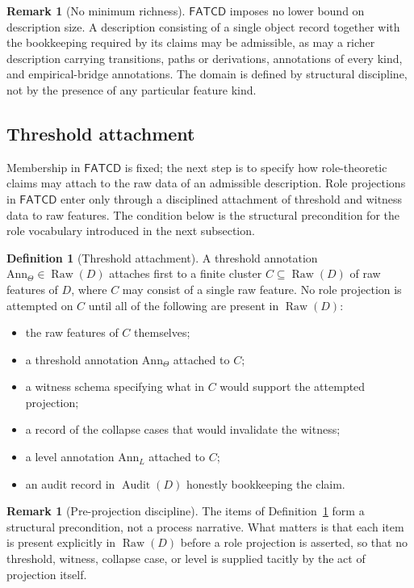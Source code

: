 \documentclass[11pt]{article}
\theoremstyle{definition}
\newtheorem{definition}[theorem]{Definition}
\newtheorem{remark}[theorem]{Remark}
\newcommand{\FATCD}{\ensuremath{\mathsf{FATCD}}}
\newcommand{\Raw}[1]{\ensuremath{\operatorname{Raw}\!\left(#1\right)}}
\newcommand{\Audit}[1]{\ensuremath{\operatorname{Audit}\!\left(#1\right)}}
\begin{document}
\begin{remark}[No minimum richness]\label{rem:fatcd-minimality}
\FATCD{} imposes no lower bound on description size. A description
consisting of a single object record together with the bookkeeping
required by its claims may be admissible, as may a richer description
carrying transitions, paths or derivations, annotations of every kind,
and empirical-bridge annotations. The domain is defined by structural
discipline, not by the presence of any particular feature kind.
\end{remark}

\subsection{Threshold attachment}\label{subsec:threshold-attachment}

Membership in \FATCD{} is fixed; the next step is to specify how
role-theoretic claims may attach to the raw data of an admissible
description. Role projections in \FATCD{} enter only through a
disciplined attachment of threshold and witness data to raw features.
The condition below is the structural precondition for the role
vocabulary introduced in the next subsection.

\begin{definition}[Threshold attachment]\label{def:threshold-attachment}
A threshold annotation \(\mathrm{Ann}_\Theta \in \Raw{D}\) attaches first to
a finite cluster \(C \subseteq \Raw{D}\) of raw features of \(D\), where \(C\)
may consist of a single raw feature. No role projection is attempted on \(C\)
until all of the following are present in \(\Raw{D}\):
\begin{itemize}[topsep=2pt,itemsep=1pt]
  \item the raw features of \(C\) themselves;
  \item a threshold annotation \(\mathrm{Ann}_\Theta\) attached to \(C\);
  \item a witness schema specifying what in \(C\) would support the attempted
    projection;
  \item a record of the collapse cases that would invalidate the witness;
  \item a level annotation \(\mathrm{Ann}_L\) attached to \(C\);
  \item an audit record in \(\Audit{D}\) honestly bookkeeping the claim.
\end{itemize}
\end{definition}

\begin{remark}[Pre-projection discipline]\label{rem:pre-projection}
The items of Definition~\ref{def:threshold-attachment} form a structural
precondition, not a process narrative. What matters is that each item is
present explicitly in \(\Raw{D}\) before a role projection is asserted, so
that no threshold, witness, collapse case, or level is supplied tacitly by
the act of projection itself.
\end{remark}
\end{document}
